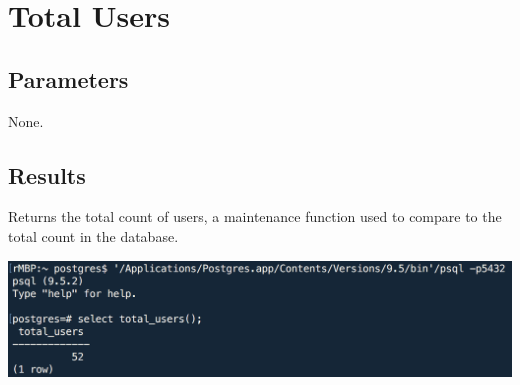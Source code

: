 \section{Total Users}

\subsection{Parameters}
None.

\subsection{Results}
Returns the total count of users, a maintenance function used to compare to the total count in the database.

\begin{center}
\includegraphics[width=\columnwidth]{include/assets/screenshots/total_users}
\end{center}